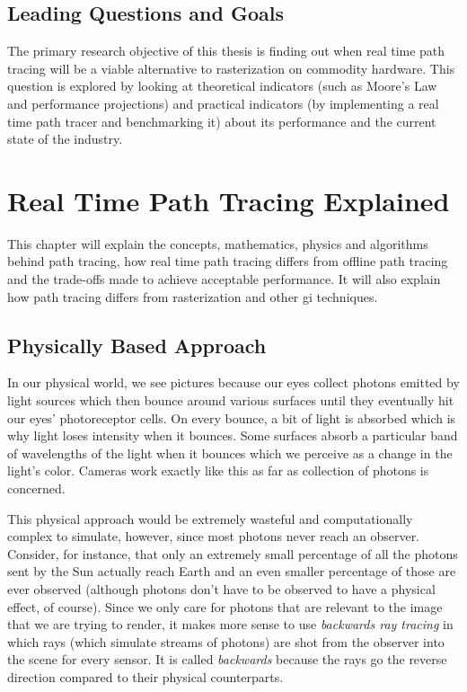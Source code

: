 \documentclass[
  twoside,
  11pt, a4paper,
  footinclude=true,
  headinclude=true,
  cleardoublepage=empty
]{scrreprt}
\begin{document}
\section{Leading Questions and Goals}
The primary research objective of this thesis is finding out when real time path tracing will be a
viable alternative to rasterization on commodity hardware. This question is explored by looking at
theoretical indicators (such as Moore's Law and performance projections) and practical indicators (by implementing a real time
path tracer and benchmarking it) about its performance and the current state of the industry.

\chapter{Real Time Path Tracing Explained}
This chapter will explain the concepts, mathematics, physics and algorithms behind path tracing,
how real time path tracing differs from offline path tracing and the trade-offs made to achieve
acceptable performance. It will also explain how path tracing differs from rasterization and other
\ac{gi} techniques.

\section{Physically Based Approach}
In our physical world, we see pictures because our eyes collect photons emitted by light
sources which then bounce around various surfaces until they eventually hit our eyes'
photoreceptor cells. On every bounce, a bit of light is absorbed which is why light loses intensity
when it bounces. Some surfaces absorb a particular band of wavelengths of the light when it bounces
which we perceive as a change in the light's color. Cameras work exactly like this as far as
collection of photons is concerned.

This physical approach would be extremely wasteful and
computationally complex to simulate, however, since most photons never reach an observer. Consider,
for instance, that only an extremely small percentage of all the photons sent by the Sun actually
reach Earth and an even smaller percentage of those are ever observed (although photons
don't have to be observed to have a physical effect, of course). Since we only care for photons that
are relevant to the image that we are trying to render, it makes more sense to use
\emph{backwards ray tracing} in which rays (which simulate streams of photons) are shot from the
observer into the scene for every sensor. It is called \textit{backwards} because the rays go
the reverse direction compared to their physical counterparts.
\end{document}

